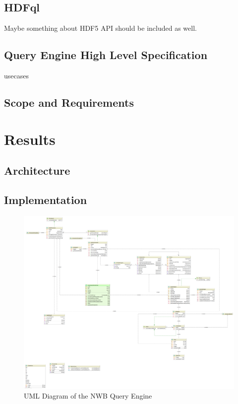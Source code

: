 \documentclass[utf8]{frontiersSCNS} %
\begin{document}
\subsection{HDFql}

Maybe something about HDF5 API should be included as well.

\subsection{Query Engine High Level Specification}
\label{Query_engine_specification}
usecases

\subsection{Scope and Requirements}
\label{Scope_and_requirements}


\section{Results}
\label{results}

\subsection{Architecture}
\label{Architecture}

\subsection{Implementation}
\label{Implementation}

\begin{figure}
  \includegraphics[width=17cm]{diagram}
\caption{UML Diagram of the NWB Query Engine}
\label{fig:diagram}
\end{figure}
\end{document}
